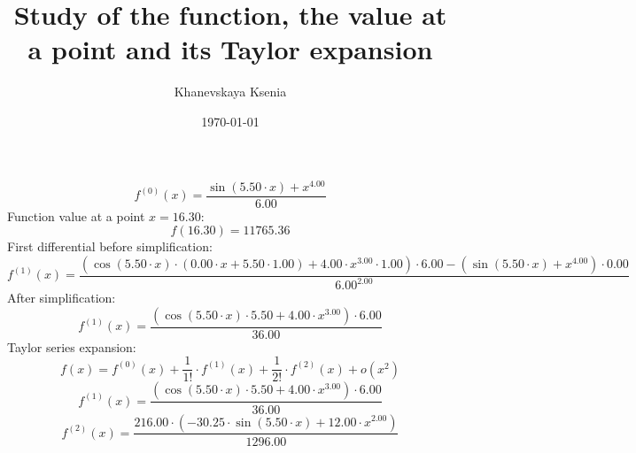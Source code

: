 \documentclass[12pt, letterpaper]{article}
\title {Study of the function, the value at a point and its Taylor expansion}
\author{Khanevskaya Ksenia}
\date{\today}
\begin{document}
\maketitle
\[f^{(0)}(x)=\frac{\sin(5.50 \cdot x)+x^{4.00}}{6.00}\]
Function value at a point $x=16.30$: \[f(16.30)=11765.36\]
First differential before simplification:
\[f^{(1)}(x)=\frac{(\cos(5.50 \cdot x) \cdot (0.00 \cdot x+5.50 \cdot 1.00)+4.00 \cdot x^{3.00} \cdot 1.00) \cdot 6.00-(\sin(5.50 \cdot x)+x^{4.00}) \cdot 0.00}{6.00^{2.00}}\]
After simplification:
\[f^{(1)}(x)=\frac{(\cos(5.50 \cdot x) \cdot 5.50+4.00 \cdot x^{3.00}) \cdot 6.00}{36.00}\]
Taylor series expansion:
\[f(x)=f^{(0)}(x)+\frac{1}{1!} \cdot f^{(1)}(x)+\frac{1}{2!} \cdot f^{(2)}(x) + o(x^{2})\]
\[f^{(1)}(x)=\frac{(\cos(5.50 \cdot x) \cdot 5.50+4.00 \cdot x^{3.00}) \cdot 6.00}{36.00}\]
\[f^{(2)}(x)=\frac{216.00 \cdot (-30.25 \cdot \sin(5.50 \cdot x)+12.00 \cdot x^{2.00})}{1296.00}\]
\end{document}
